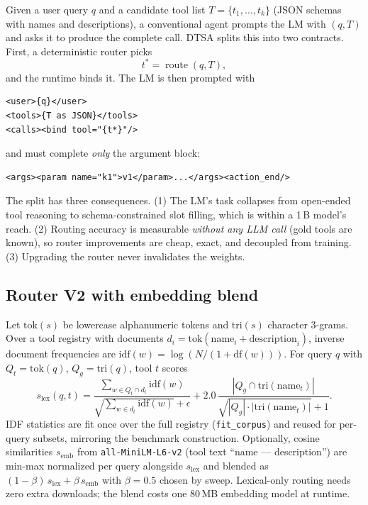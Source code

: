 \documentclass[11pt]{article}
\newcommand{\code}[1]{\texttt{#1}}
\begin{document}
Given a user query $q$ and a candidate tool list $T = \{t_1, \dots, t_k\}$
(JSON schemas with names and descriptions), a conventional agent prompts the LM
with $(q, T)$ and asks it to produce the complete call. DTSA splits this into
two contracts. First, a deterministic router picks
\begin{equation}
  t^* = \operatorname{route}(q, T),
\end{equation}
and the runtime binds it. The LM is then prompted with
\begin{lstlisting}
<user>{q}</user>
<tools>{T as JSON}</tools>
<calls><bind tool="{t*}"/>
\end{lstlisting}
and must complete \emph{only} the argument block:
\begin{lstlisting}
<args><param name="k1">v1</param>...</args><action_end/>
\end{lstlisting}
The split has three consequences. (1) The LM's task collapses from open-ended
tool reasoning to schema-constrained slot filling, which is within a 1\,B
model's reach. (2) Routing accuracy is measurable \emph{without any LLM call}
(gold tools are known), so router improvements are cheap, exact, and decoupled
from training. (3) Upgrading the router never invalidates the weights.

\subsection{Router V2 with embedding blend}
\label{sec:router}

Let $\mathrm{tok}(s)$ be lowercase alphanumeric tokens and $\mathrm{tri}(s)$
character 3-grams. Over a tool registry with documents
$d_i = \mathrm{tok}(\mathrm{name}_i + \mathrm{description}_i)$, inverse document
frequencies are $\mathrm{idf}(w) = \log(N / (1 + \mathrm{df}(w)))$. For query
$q$ with $Q_t = \mathrm{tok}(q)$, $Q_g = \mathrm{tri}(q)$, tool $t$ scores
\begin{equation}
  s_{\mathrm{lex}}(q,t) =
  \frac{\sum_{w \in Q_t \cap d_t}\mathrm{idf}(w)}
       {\sqrt{\sum_{w \in d_t}\mathrm{idf}(w)} + \epsilon}
  + 2.0\,
  \frac{|Q_g \cap \mathrm{tri}(\mathrm{name}_t)|}
       {\sqrt{|Q_g|\cdot|\mathrm{tri}(\mathrm{name}_t)|} + 1}.
  \label{eq:lex}
\end{equation}
IDF statistics are fit once over the full registry (\code{fit\_corpus}) and
reused for per-query subsets, mirroring the benchmark construction. Optionally,
cosine similarities $s_{\mathrm{emb}}$ from \code{all-MiniLM-L6-v2} (tool text
``name --- description'') are min-max normalized per query alongside
$s_{\mathrm{lex}}$ and blended as $(1-\beta)\,s_{\mathrm{lex}} +
\beta\,s_{\mathrm{emb}}$ with $\beta = 0.5$ chosen by sweep. Lexical-only routing
needs zero extra downloads; the blend costs one 80\,MB embedding model at
runtime.
\end{document}
